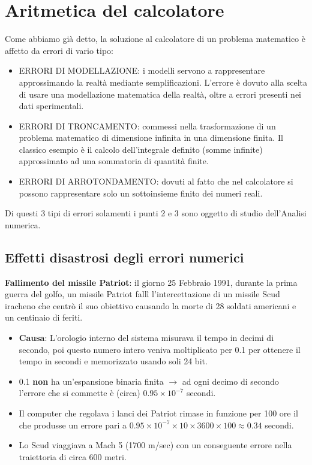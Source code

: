 \documentclass[a4paper, 11pt]{article}
\begin{document}
        \pagebreak 
        \section{Aritmetica del calcolatore}
        
            Come abbiamo già detto, la soluzione al calcolatore di un problema matematico è affetto da errori di vario tipo:

            \begin{itemize}
                \item ERRORI DI MODELLAZIONE: i modelli servono a rappresentare approssimando la realtà mediante semplificazioni. L'errore è dovuto alla scelta di usare una modellazione matematica della realtà, oltre a errori presenti nei dati sperimentali.
                \item ERRORI DI TRONCAMENTO: commessi nella trasformazione di un problema matematico di dimensione infinita in una dimensione finita. Il classico esempio è il calcolo dell'integrale definito (somme infinite) approssimato ad una sommatoria di quantità finite.
                \item ERRORI DI ARROTONDAMENTO: dovuti al fatto che nel calcolatore si possono rappresentare solo un sottoinsieme finito dei numeri reali.
            \end{itemize} 

            Di questi 3 tipi di errori solamenti i punti 2 e 3 sono oggetto di studio dell'Analisi numerica.

            \subsection*{Effetti disastrosi degli errori numerici}

            \textbf{Fallimento del missile Patriot}: il giorno 25 Febbraio 1991, durante la prima guerra del golfo, un missile Patriot fallì l’intercettazione di un missile Scud iracheno che centrò il suo obiettivo causando la morte di 28 soldati americani e un centinaio di feriti.

            \begin{itemize}
                \item \textbf{Causa}: L’orologio interno del sistema misurava il tempo in decimi di secondo, poi questo numero intero veniva moltiplicato per 0.1 per ottenere il tempo in secondi e memorizzato usando soli 24 bit.
                \item 0.1 \textbf{non} ha un’espansione binaria finita $\longrightarrow$ ad ogni decimo di secondo l’errore che si commette è (circa) $0.95 \times 10^{-7}$ secondi.
                \item Il computer che regolava i lanci dei Patriot rimase in funzione per 100 ore il che produsse un errore pari a $0.95 \times 10^{-7} \times 10 \times 3600 \times 100 \approx 0.34$ secondi.
                \item Lo Scud viaggiava a Mach 5 (1700 m/sec) con un conseguente errore nella traiettoria di circa 600 metri.
            \end{itemize}
\end{document}
